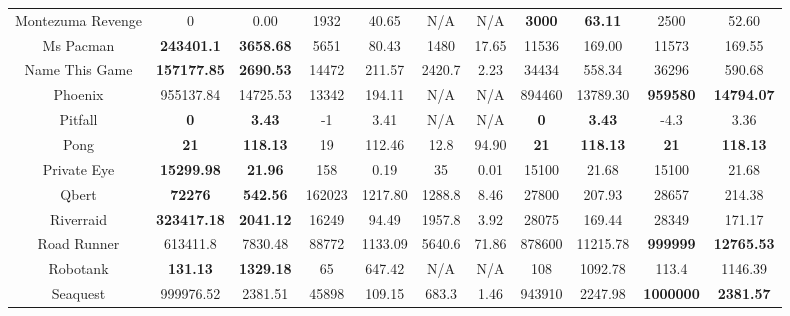 \documentclass[nohyperref]{article}
\newcommand{\best}[1]{\textbf{#1}}
\theoremstyle{plain}
\begin{document}
\begin{table}[!hb]
\begin{center}
\begin{tabular}{|c |c c| c c| c c| c c| c c|}
 Montezuma Revenge  & 0                     & 0.00         & 1932     &40.65       &N/A       & N/A     & \best{3000}        & \best{63.11  }                 &2500            &52.60\\
 Ms Pacman          & \textbf{243401.1 }      & \textbf{3658.68    }  & 5651     &80.43       &1480      & 17.65   & 11536       & 169.00                     &11573           &169.55\\
 Name This Game     & \textbf{157177.85}      & \textbf{2690.53    }  & 14472    &211.57      &2420.7    & 2.23    & 34434       & 558.34                     &36296           &590.68\\
 Phoenix            & 955137.84      & 14725.53     & 13342     &194.11      &N/A       & N/A     & 894460      & 13789.30                  &\textbf{959580 }         &	\textbf{14794.07}\\
 Pitfall            &\textbf{ 0}                     & \textbf{3.43}         & -1        &3.41        &N/A       & N/A     & \best{0}       & \best{3.43  }   &-4.3            &3.36\\
 Pong               & \textbf{21}                    & \textbf{118.13}       & 19        &112.46      & 12.8     & 94.90   & \best{21}      & \best{118.13}   &\textbf{21}     &\textbf{118.13}   \\
 Private Eye        & \textbf{15299.98 }      & \textbf{21.96  }      & 158       &0.19        & 35       & 0.01    & 15100       & 21.68                     &15100           &21.68\\
 Qbert              & \textbf{72276          }& \textbf{542.56 }      & 162023    &1217.80     & 1288.8   & 8.46    & 27800       & 207.93                    &28657           &214.38\\
 Riverraid          & \textbf{323417.18}      & \textbf{2041.12}      & 16249    &94.49       & 1957.8   & 3.92    & 28075       & 169.44                     &28349           &171.17\\
 Road Runner        & 613411.8              & 7830.48      & 88772    &1133.09     & 5640.6   & 71.86   & 878600      & 11215.78                              &\textbf{999999	} &\textbf{12765.53}\\
 Robotank           & \textbf{131.13}         & \textbf{1329.18}      & 65        &647.42      & N/A      & N/A     & 108         & 1092.78                   &113.4           &1146.39\\
 Seaquest           & 999976.52             & 2381.51      & 45898    &109.15      & 683.3    & 1.46    &943910	           &2247.98             &\textbf{1000000}          &\textbf{2381.57}\\

\end{tabular}
\end{center}
\end{table}
\end{document}
